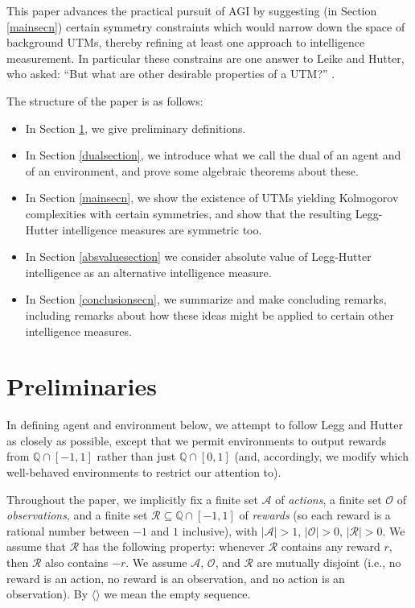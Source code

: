 \documentclass[runningheads]{llncs}
\begin{document}
This paper advances the practical pursuit of AGI by suggesting
(in Section \ref{mainsecn})
certain symmetry constraints which would narrow down the space of
background UTMs, thereby refining at least one approach to
intelligence measurement. In particular these constrains are one
answer to Leike and Hutter, who asked: ``But what are other desirable
properties of a UTM?'' \cite{leike2015bad}.

The structure of the paper is as follows:
\begin{itemize}
    \item In Section \ref{prelimsecn}, we give preliminary definitions.
    \item In Section \ref{dualsection}, we introduce what we call the dual of an agent and of
        an environment, and prove some algebraic theorems about these.
    \item In Section \ref{mainsecn}, we show the existence of UTMs yielding Kolmogorov
        complexities with certain symmetries, and show that the resulting Legg-Hutter
        intelligence measures are symmetric too.
    \item In Section \ref{absvaluesection} we consider absolute value of Legg-Hutter
        intelligence as an alternative intelligence measure.
    \item In Section \ref{conclusionsecn}, we summarize and make concluding remarks, including
        remarks about how these ideas might be applied to certain other intelligence measures.
\end{itemize}

\section{Preliminaries}
\label{prelimsecn}

In defining agent and environment below, we attempt to follow
Legg and Hutter \cite{legg2007universal} as closely as possible,
except that we permit environments to output rewards from $\mathbb Q \cap [-1,1]$
rather than just $\mathbb Q\cap [0,1]$ (and, accordingly, we modify which well-behaved
environments to restrict our attention to).

Throughout the paper, we implicitly
fix a finite set $\mathcal A$ of \emph{actions},
a finite set $\mathcal O$ of \emph{observations},
and a finite set $\mathcal R\subseteq \mathbb Q\cap [-1,1]$ of \emph{rewards}
(so each reward is a rational number between $-1$ and $1$ inclusive),
with $|\mathcal A|>1$,
$|\mathcal O|>0$, $|\mathcal R|>0$.
We assume that $\mathcal R$ has the following property:
whenever $\mathcal R$ contains any reward $r$, then $\mathcal R$
also contains $-r$.
We assume $\mathcal A$, $\mathcal O$, and $\mathcal R$ are mutually disjoint
(i.e., no reward is an action, no reward is an observation, and no action is an
observation).
By $\langle\rangle$ we mean the empty sequence.
\end{document}
